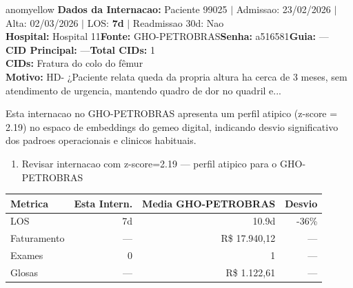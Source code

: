 \documentclass[a4paper,10pt]{article}
\begin{document}
\begin{anomalycard}[Internacao 166330 | GHO-PETROBRAS | MODERADO (z=2.19)]{anomyellow}
\textbf{Dados da Internacao:} Paciente 99025 $\mid$ Admissao: 23/02/2026 $\mid$ Alta: 02/03/2026 $\mid$ LOS: \textbf{7d} $\mid$ Readmissao 30d: Nao\\
\textbf{Hospital:} Hospital 11\quad\textbf{Fonte:} GHO-PETROBRAS\quad\textbf{Senha:} a516581\quad\textbf{Guia:} ---\\
\textbf{CID Principal:} {\small ---}\quad\textbf{Total CIDs:} 1\\

\textbf{CIDs:} {\scriptsize Fratura do colo do fêmur}\\

\textbf{Motivo:} {\scriptsize HD- ¿Paciente relata queda da propria altura ha cerca de 3 meses, sem atendimento de urgencia, mantendo quadro de dor no quadril e...}\\

\vspace{2pt}\begin{tcolorbox}[colback=severityred!20,colframe=anomyellow,title={\textbf{Interpretacao de Negocio}},fonttitle=\bfseries\small,left=4pt,right=4pt,top=3pt,bottom=3pt]
{\small Esta internacao no GHO-PETROBRAS apresenta um perfil atipico (z-score = 2.19) no espaco de embeddings do gemeo digital, indicando desvio significativo dos padroes operacionais e clinicos habituais.}
\end{tcolorbox}
\begin{tcolorbox}[colback=severityyellow!30,colframe=anomorange,title={\textbf{Recomendacoes Especificas}},fonttitle=\bfseries\small,left=4pt,right=4pt,top=3pt,bottom=3pt]
\begin{enumerate}[nosep,leftmargin=16pt]
\item {\small Revisar internacao com z-score=2.19 --- perfil atipico para o GHO-PETROBRAS}
\end{enumerate}
\end{tcolorbox}
\begin{center}\begin{tabular}{l r r r}\toprule\textbf{Metrica} & \textbf{Esta Intern.} & \textbf{Media GHO-PETROBRAS} & \textbf{Desvio} \\\midrule
LOS & 7d & 10.9d & -36\% \\
Faturamento & --- & R\$ 17.940,12 & --- \\
Exames & 0 & 1 & --- \\
Glosas & --- & R\$ 1.122,61 & --- \\
\bottomrule\end{tabular}\end{center}


\end{anomalycard}
\end{document}

